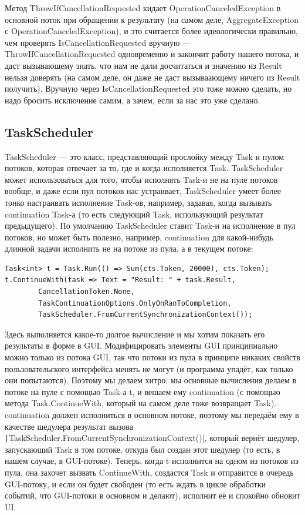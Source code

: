 \documentclass{../../text-style}
\begin{document}
Метод ThrowIfCancellationRequested кидает OperationCanceledException в основной поток при обращении к результату (на самом деле, AggregateException с OperationCanceledException), и это считается более идеологически правильно, чем проверять IsCancellationRequested вручную --- ThrowIfCancellationRequested одновременно и закончит работу нашего потока, и даст вызывающему знать, что нам не дали досчитаться и значению из Result нельзя доверять (на самом деле, он даже не даст вызываающему ничего из Result получить). Вручную через IsCancellationRequested это тоже можно сделать, но надо бросить исключение самим, а зачем, если за нас это уже сделано.

\subsection{TaskScheduler}

TaskScheduler --- это класс, представляющий прослойку между Task и пулом потоков, которая отвечает за то, где и когда исполняется Task. TaskScheduler может использоваться для того, чтобы исполнять Task-и не на пуле потоков вообще, и даже если пул потоков нас устраивает, TaskScheduler умеет более тонко настраивать исполнение Task-ов, например, задавая, когда вызывать continuation Task-а (то есть следующий Task, использующий результат предыдущего). По умолчанию TaskScheduler ставит Task-и на исполнение в пул потоков, но может быть полезно, например, continuation для какой-нибудь длинной задачи исполнить не на потоке из пула, а в текущем потоке:

\begin{verbatim}
Task<int> t = Task.Run(() => Sum(cts.Token, 20000), cts.Token);
t.ContinueWith(task => Text = "Result: " + task.Result,
        CancellationToken.None,
        TaskContinuationOptions.OnlyOnRanToCompletion,
        TaskScheduler.FromCurrentSynchronizationContext());
\end{verbatim}

Здесь выполняется какое-то долгое вычисление и мы хотим показать его результаты в форме в GUI. Модифицировать элементы GUI принципиально можно только из потока GUI, так что потоки из пула в принципе никаких свойств пользовательского интерфейса менять не могут (и программа упадёт, как только они попытаются). Поэтому мы делаем хитро: мы основные вычисления делаем в потоке на пуле с помощью Task-а t, и вешаем ему continuation (с помощью метода Task.ContinueWith, который на самом деле тоже возвращает Task). continuation должен исполниться в основном потоке, поэтому мы передаём ему в качестве шедулера результат вызова \texttt|TaskScheduler.FromCurrentSynchronizationContext()|, который вернёт шедулер, запускающий Task в том потоке, откуда был создан этот шедулер (то есть, в нашем случае, в GUI-потоке). Теперь, когда t исполнится на одном из потоков из пула, она захочет вызвать ContinueWith, создастся Task и отправится в очередь GUI-потоку, и если он будет свободен (то есть ждать в цикле обработки событий, что GUI-потоки в основном и делают), исполнит её и спокойно обновит UI.
\end{document}
